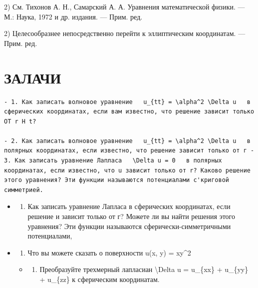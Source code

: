 \documentclass[
]{article}
\providecommand{\tightlist}{%
  \setlength{\itemsep}{0pt}\setlength{\parskip}{0pt}}
\begin{document}
2) См. Тихонов А. Н., Самарский А. А. Уравнения математической физики.
--- М.: Наука, 1972 и др. издания. --- Прим. ред.

2) Целесообразнее непосредственно перейти к эллиптическим координатам.
--- Прим. ред.

\section{ЗАЛАЧИ}\label{ux437ux430ux43bux430ux447ux438}

\begin{verbatim}
- 1. Как записать волновое уравнение   u_{tt} = \alpha^2 \Delta u   в сферических координатах, если вам известно, что решение зависит только OT r H t?

- 2. Как записать волновое уравнение   u_{tt} = \alpha^2 \Delta u   в полярных координатах, если известно, что решение зависит только от г - 3. Как записать уравнение Лапласа   \Delta u = 0   в полярных координатах, если известно, что u зависит только от r? Каково решение этого уравнения? Эти функции называются потенциалами с'криговой симметрией.
\end{verbatim}

\begin{itemize}
\item
  \begin{enumerate}
  \def\labelenumi{\arabic{enumi}.}
  \setcounter{enumi}{3}
  \tightlist
  \item
    Как записать уравнение Лапласа в сферических координатах, если
    решение и зависит только от г? Можете ли вы найти решения этого
    уравнения? Эти функции называются сферически-симметричными
    потенциалами,
  \end{enumerate}
\item
  \begin{enumerate}
  \def\labelenumi{\arabic{enumi}.}
  \setcounter{enumi}{4}
  \tightlist
  \item
    Что вы можете сказать о поверхности u(x, y) = xy\^{}2
  \end{enumerate}

  \begin{itemize}
  \tightlist
  \item
    \begin{enumerate}
    \def\labelenumi{\arabic{enumi}.}
    \setcounter{enumi}{5}
    \tightlist
    \item
      Преобразуйте трехмерный лапласиан \textbackslash Delta u =
      u\_\{xx\} + u\_\{yy\} + u\_\{zz\} к сферическим координатам.
    \end{enumerate}
  \end{itemize}
\end{itemize}
\end{document}
